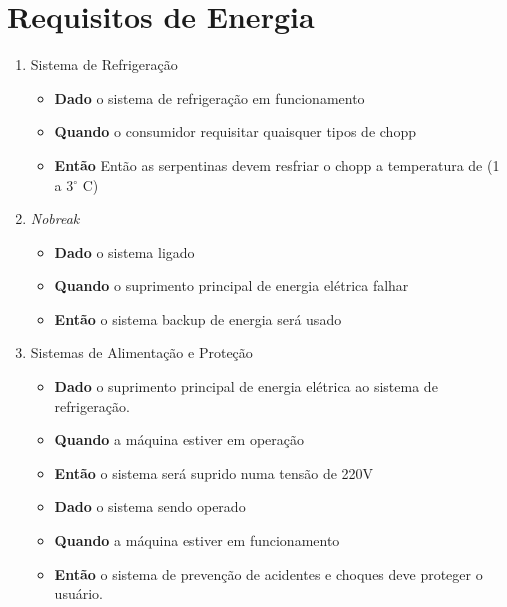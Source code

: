 	\section[Requisitos de Energia]{Requisitos de Energia}
		\begin{enumerate}
			\item Sistema de Refrigeração
				\begin{itemize}
					\item \textbf{Dado} o sistema de refrigeração em funcionamento  
					\item \textbf{Quando} o consumidor requisitar quaisquer tipos de chopp 
					\item \textbf{Então} Então as serpentinas devem resfriar o chopp a temperatura de (1 a 3$^{\circ}$ C)
				\end{itemize}
			\item \textit{Nobreak} 
				\begin{itemize}
					\item \textbf{Dado} o sistema ligado
					\item \textbf{Quando} o suprimento principal de energia elétrica falhar
					\item \textbf{Então} o sistema backup de energia será usado
				\end{itemize}
			\item Sistemas de Alimentação e Proteção 
				\begin{itemize}
					\item \textbf{Dado} o suprimento principal de energia elétrica ao sistema de refrigeração.
					\item \textbf{Quando} a máquina estiver em operação 
					\item \textbf{Então} o sistema será suprido numa tensão de 220V
					\item \textbf{Dado} o sistema sendo operado 
					\item \textbf{Quando} a máquina estiver em funcionamento 
					\item \textbf{Então} o sistema de prevenção de acidentes e choques deve proteger o usuário.
				\end{itemize}
		\end{enumerate}



